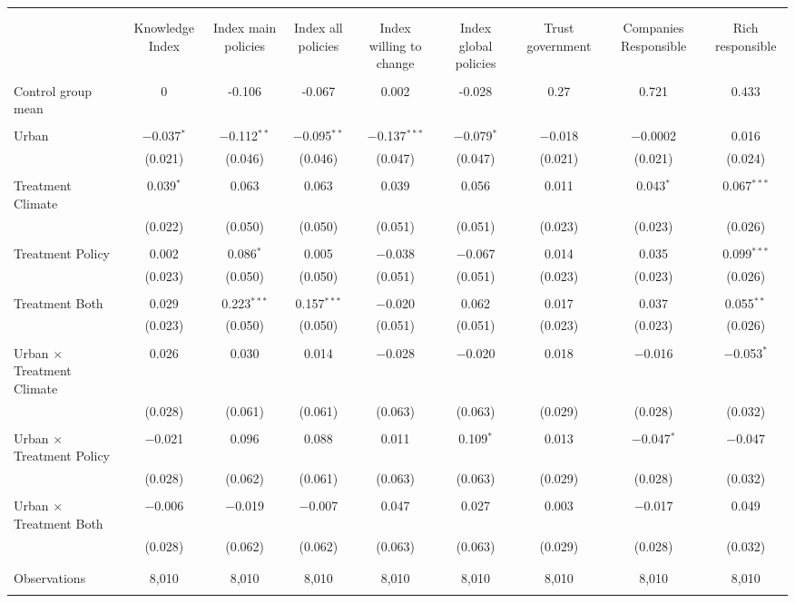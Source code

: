 
\begin{tabular}{@{\extracolsep{5pt}}lcccccccc} 
\\[-1.8ex]\hline 
\hline \\[-1.8ex] 
\\[-1.8ex] & Knowledge Index & Index main policies & Index all policies & Index willing to change & Index global policies & Trust government & Companies Responsible & Rich responsible \\ 
\hline \\[-1.8ex] 
 Control group mean & 0 & -0.106 & -0.067 & 0.002 & -0.028 & 0.27 & 0.721 & 0.433  \\ \hline \\[-1.8ex] Urban & $-$0.037$^{*}$ & $-$0.112$^{**}$ & $-$0.095$^{**}$ & $-$0.137$^{***}$ & $-$0.079$^{*}$ & $-$0.018 & $-$0.0002 & 0.016 \\ 
  & (0.021) & (0.046) & (0.046) & (0.047) & (0.047) & (0.021) & (0.021) & (0.024) \\ 
  & & & & & & & & \\ 
 Treatment Climate & 0.039$^{*}$ & 0.063 & 0.063 & 0.039 & 0.056 & 0.011 & 0.043$^{*}$ & 0.067$^{***}$ \\ 
  & (0.022) & (0.050) & (0.050) & (0.051) & (0.051) & (0.023) & (0.023) & (0.026) \\ 
  & & & & & & & & \\ 
 Treatment Policy & 0.002 & 0.086$^{*}$ & 0.005 & $-$0.038 & $-$0.067 & 0.014 & 0.035 & 0.099$^{***}$ \\ 
  & (0.023) & (0.050) & (0.050) & (0.051) & (0.051) & (0.023) & (0.023) & (0.026) \\ 
  & & & & & & & & \\ 
 Treatment Both & 0.029 & 0.223$^{***}$ & 0.157$^{***}$ & $-$0.020 & 0.062 & 0.017 & 0.037 & 0.055$^{**}$ \\ 
  & (0.023) & (0.050) & (0.050) & (0.051) & (0.051) & (0.023) & (0.023) & (0.026) \\ 
  & & & & & & & & \\ 
 Urban $\times$ Treatment Climate & 0.026 & 0.030 & 0.014 & $-$0.028 & $-$0.020 & 0.018 & $-$0.016 & $-$0.053$^{*}$ \\ 
  & (0.028) & (0.061) & (0.061) & (0.063) & (0.063) & (0.029) & (0.028) & (0.032) \\ 
  & & & & & & & & \\ 
 Urban $\times$ Treatment Policy & $-$0.021 & 0.096 & 0.088 & 0.011 & 0.109$^{*}$ & 0.013 & $-$0.047$^{*}$ & $-$0.047 \\ 
  & (0.028) & (0.062) & (0.061) & (0.063) & (0.063) & (0.029) & (0.028) & (0.032) \\ 
  & & & & & & & & \\ 
 Urban $\times$ Treatment Both & $-$0.006 & $-$0.019 & $-$0.007 & 0.047 & 0.027 & 0.003 & $-$0.017 & 0.049 \\ 
  & (0.028) & (0.062) & (0.062) & (0.063) & (0.063) & (0.029) & (0.028) & (0.032) \\ 
  & & & & & & & & \\ 
\hline \\[-1.8ex] 

Observations & 8,010 & 8,010 & 8,010 & 8,010 & 8,010 & 8,010 & 8,010 & 8,010 \\ 
\hline 
\hline \\[-1.8ex] 
\end{tabular} 